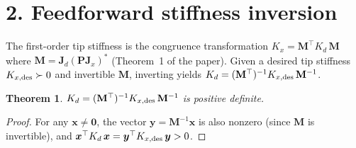 \documentclass[11pt]{article}
\newcommand{\vv}[1]{\bm{#1}}
\newcommand{\mm}[1]{\mathbf{#1}}
\theoremstyle{plain}
\newtheorem{theorem}{Theorem}
\theoremstyle{definition}
\begin{document}
\section*{2.\; Feedforward stiffness inversion}

The first-order tip stiffness is the congruence transformation
$K_x=\mm{M}^{\top}K_d\,\mm{M}$ where $\mm{M}=\mm{J}_d(\mm{P}\mm{J}_x)^*$
(Theorem~1 of the paper).
Given a desired tip stiffness $K_{x,{\rm des}}\succ 0$ and invertible $\mm{M}$,
inverting yields $K_d=(\mm{M}^{\top})^{-1}K_{x,{\rm des}}\,\mm{M}^{-1}$.

\begin{theorem}
$K_d=(\mm{M}^{\top})^{-1}K_{x,{\rm des}}\,\mm{M}^{-1}$ is positive definite.
\end{theorem}
\begin{proof}
For any $\vv{x}\neq\vv{0}$, the vector $\vv{y}=\mm{M}^{-1}\vv{x}$ is also nonzero
(since $\mm{M}$ is invertible), and
$\vv{x}^{\top}K_d\,\vv{x}=\vv{y}^{\top}K_{x,{\rm des}}\,\vv{y}>0$.
\end{proof}
\end{document}
